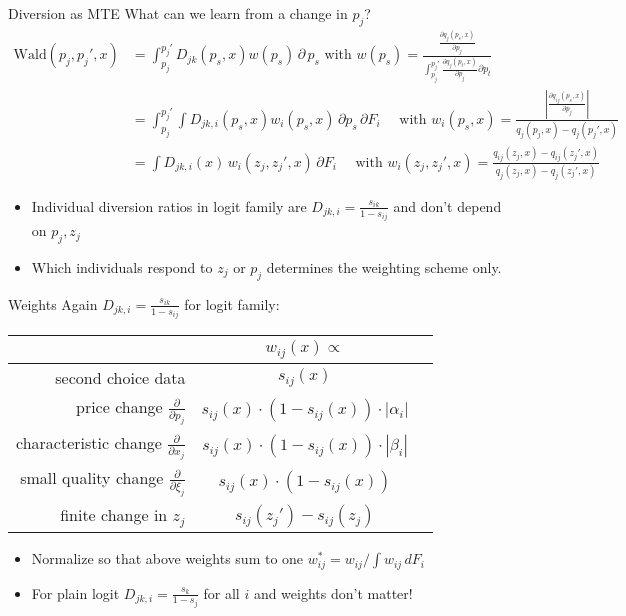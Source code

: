 \documentclass[aspectratio=169,10pt]{beamer}
\begin{document}
\begin{frame}{Diversion as MTE}
\footnotesize
What can we learn from a change in $p_j$?
\begin{align*}
\text{Wald}(p_j, p_j',x)
&=\int_{p_j}^{p_j'} D_{jk}(p_s,x) w(p_s) \, \partial \, p_s \mbox{ with }
w(p_s)=\frac{  \frac{\partial q_j(p_s,x)}{\partial p_j} }{\int_{p_j}^{p_j'}  \frac{\partial q_j(p_t,x)}{\partial p_j} \partial p_t} \\
\nonumber &=\int_{p_j}^{p_j'} \int D_{jk,i}(p_s,x)  w_i(p_s,x) \, \partial p_s  \, \partial F_i \quad \mbox{ with } w_i(p_s,x) = \frac{\left| \frac{\partial q_{ij}(p_s,x)}{\partial p_j} \right|}{q_j(p_j,x)- q_j(p_j',x)}\\
&= \int D_{jk,i}(x) \, w_i(z_j,z_j',x)  \, \partial F_i \quad \mbox{ with } w_i(z_j,z_j',x) = \frac{q_{ij}(z_j,x)- q_{ij}(z_j',x) }{q_j(z_j,x)- q_j(z_j',x)}
\end{align*}
\begin{itemize}
\item Individual diversion ratios in logit family are $D_{jk,i} = \frac{s_{ik}}{1-s_{ij}}$ and don't depend on $p_j,z_j$
\item Which individuals respond to $z_j$ or $p_j$ determines the weighting scheme only.
\end{itemize}
\end{frame}

\begin{frame}{Weights}
Again $D_{jk,i} = \frac{s_{ik}}{1-s_{ij}}$ for logit family:\\
\begin{center}
\begin{tabular}{rcc} 
& $w_{i j}(x) \propto$ \\
\midrule second choice data & $s_{i j}(x)$ \\
price change $\frac{\partial}{\partial p_{j}}$ & $s_{i j}(x) \cdot\left(1-s_{i j}(x)\right) \cdot\left|\alpha_{i}\right|$ \\
characteristic change $\frac{\partial}{\partial x_{j}}$ & $s_{i j}(x) \cdot\left(1-s_{i j}(x)\right) \cdot\left|\beta_{i}\right|$ \\
small quality change $\frac{\partial}{\partial \xi_{j}}$ & $s_{i j}(x) \cdot\left(1-s_{i j}(x)\right)$ \\
finite change in $z_j$ & $s_{ij}(z_j') - s_{ij}(z_j)$\\
\midrule
\end{tabular}
\end{center}
\begin{itemize}
\item Normalize so that above weights sum to one $w_{ij}^* = w_{ij}/\int w_{ij} \, d F_i$
\item For plain logit $D_{jk,i} = \frac{s_{k}}{1-s_{j}}$ for all $i$ and weights don't matter!
\end{itemize}
\end{frame}
\end{document}
